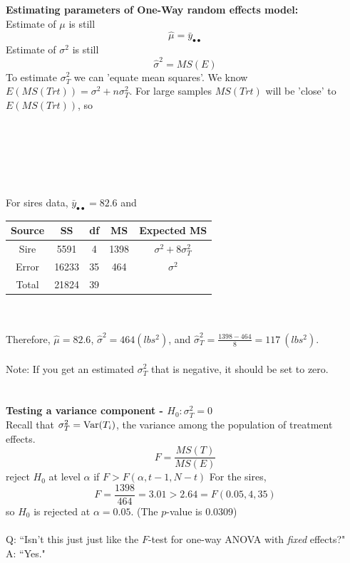 \textbf{Estimating parameters of One-Way random effects model:}\\
Estimate of $\mu$ is still
$$\hat\mu = \bar{y}_{\bullet\bullet}$$
Estimate of $\sigma^2$ is still
$$\hat\sigma^2 = MS(E)$$
To estimate $\sigma^2_T$ we can 'equate mean squares'.  We know $E(MS(Trt))=\sigma^2+n\sigma^2_T$.  For large samples $MS(Trt)$ will be 'close' to $E(MS(Trt))$, so
~\\~\\~\\~\\~\\~\\~\\
For sires data, $\bar{y}_{\bullet\bullet}=82.6$ and 
\begin{center}
\begin{tabular}{ccccc}
Source & SS & df & MS & Expected MS \\ \hline
Sire & 5591 & 4 & 1398 & $\sigma^2 + 8 \sigma_T^2$ \\
Error & 16233 &35 & 464 & $\sigma^2$  \\
Total & 21824 & 39 & &  \\ \hline
\end{tabular}
\end{center}
~\\~\\
Therefore, $\hat\mu = 82.6$, $\hat\sigma^2 = 464 (lbs^2)$, and $\hat\sigma_T^2 = \frac{1398-464}{8} = 117 \ (lbs^2)$.\\~\\
Note: If you get an estimated $\sigma^2_T$ that is negative, it should be set to zero.\\~\\~\\
\textbf{Testing a variance component - $H_0: \sigma_T^2=0$}\\
Recall that $\sigma_T^2 = \mbox{Var}(T_i) $, the variance among the population of treatment effects.
$$ F=\frac{MS(T)}{MS(E)} $$
reject $H_0$ at level $\alpha$ if $F > F(\alpha,t-1,N-t)$
For the sires, 
$$ F=\frac{1398}{464} = 3.01 > 2.64 = F(0.05,4,35) $$ 
so $H_0$ is rejected at $\alpha=0.05$.  (The $p$-value is 0.0309)\\~\\
Q: ``Isn't this just just like the $F$-test for one-way ANOVA with {\em fixed} effects?"\\
A: ``Yes."

\newpage

